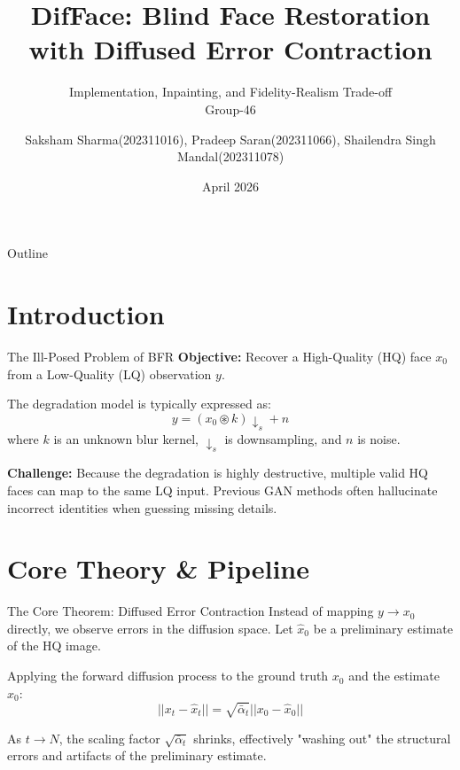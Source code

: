 \documentclass[aspectratio=169]{beamer}
\title[DifFace \& Variable $\eta$ Inference]{DifFace: Blind Face Restoration with Diffused Error Contraction}
\subtitle{Implementation, Inpainting, and Fidelity-Realism Trade-off \\ Group-46}
\author{Saksham Sharma(202311016), Pradeep Saran(202311066), Shailendra Singh Mandal(202311078)}
\institute[B.Tech CSE]{
    Department of Computer Science and Engineering \\
    Batch of 2023--2027
}
\date{April 2026}
\begin{document}
\begin{frame}
    \titlepage
\end{frame}

\begin{frame}{Outline}
    \tableofcontents
\end{frame}

\section{Introduction}

\begin{frame}{The Ill-Posed Problem of BFR}
    \textbf{Objective:} Recover a High-Quality (HQ) face $x_0$ from a Low-Quality (LQ) observation $y$.
    
    \vspace{0.3cm}
    The degradation model is typically expressed as:
    \begin{equation}
        y = (x_0 \circledast k) \downarrow_s + n
    \end{equation}
    where $k$ is an unknown blur kernel, $\downarrow_s$ is downsampling, and $n$ is noise.
    
    \vspace{0.3cm}
    \textbf{Challenge:} Because the degradation is highly destructive, multiple valid HQ faces can map to the same LQ input. Previous GAN methods often hallucinate incorrect identities when guessing missing details.
\end{frame}

\section{Core Theory \& Pipeline}

\begin{frame}{The Core Theorem: Diffused Error Contraction}
    Instead of mapping $y \to x_0$ directly, we observe errors in the diffusion space. Let $\hat{x}_0$ be a preliminary estimate of the HQ image. 
    
    Applying the forward diffusion process to the ground truth $x_0$ and the estimate $\hat{x}_0$:
    \begin{equation}
        || x_t - \hat{x}_t || = \sqrt{\bar{\alpha}_t} || x_0 - \hat{x}_0 ||
    \end{equation}
    
    As $t \to N$, the scaling factor $\sqrt{\bar{\alpha}_t}$ shrinks, effectively "washing out" the structural errors and artifacts of the preliminary estimate.
\end{frame}
\end{document}
